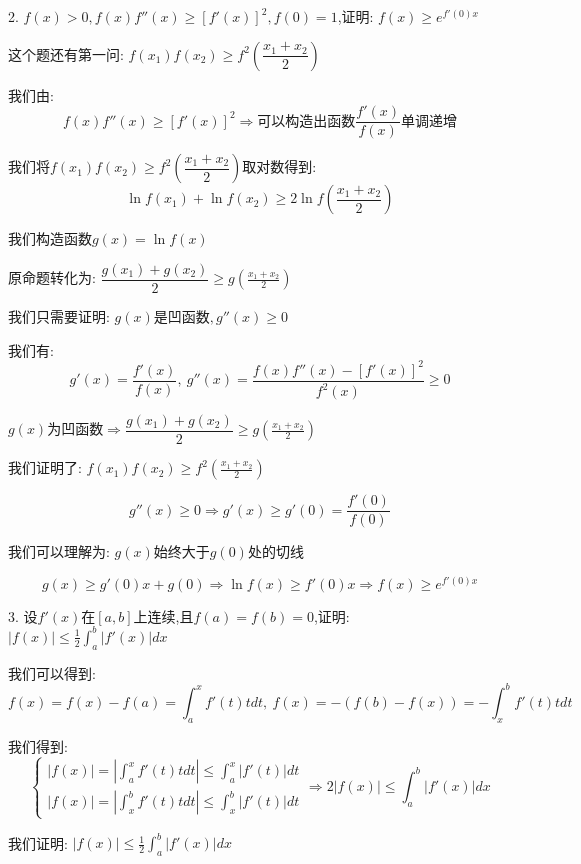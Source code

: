 
2. $f(x)>0,f(x)f''(x)\geq [f'(x)]^2,f(0)=1$,证明: $f(x)\geq e^{f'(0)x}$
\begin{solution}
	
	这个题还有第一问: $f(x_{1})f(x_{2})\geq f^2(\dfrac{x_{1}+x_{2}}{2})$
	
	我们由: $$f(x)f''(x)\geq [f'(x)]^2\Rightarrow \text{可以构造出函数}\frac{f'(x)}{f(x)}\text{单调递增}$$
	
	我们将$f(x_{1})f(x_{2})\geq f^2(\dfrac{x_{1}+x_{2}}{2})$取对数得到: 
	$$\ln f(x_{1})+\ln f(x_{2})\geq 2\ln f(\frac{x_{1}+x_{2}}{2})$$
	
	我们构造函数$g(x)=\ln f(x)$
	
	原命题转化为: $\dfrac{g(x_{1})+g(x_{2})}{2}\geq g(\frac{x_{1}+x_{2}}{2})$
	
	我们只需要证明: $g(x)\text{是凹函数},g''(x)\geq 0$
	
	我们有: $$g'(x)=\dfrac{f'(x)}{f(x)},\ g''(x)=\dfrac{f(x)f''(x)-[f'(x)]^2}{f^2(x)}\geq 0$$
	
	$g(x)\text{为凹函数}\Rightarrow \dfrac{g(x_{1})+g(x_{2})}{2}\geq g(\frac{x_{1}+x_{2}}{2})$
	
	我们证明了: $f(x_{1})f(x_{2})\geq f^2(\frac{x_{1}+x_{2}}{2})$
	
	$$g''(x)\geq 0\Rightarrow g'(x)\geq g'(0)=\dfrac{f'(0)}{f(0)}$$
	
	我们可以理解为: $g(x)\text{始终大于}g(0)\text{处的切线}$
	
	$$g(x)\geq g'(0)x+g(0)\Rightarrow \ln f(x)\geq f'(0)x\Rightarrow f(x)\geq e^{f'(0)x}$$
\end{solution}


3. 设$f'(x)$在$[a,b]$上连续,且$f(a)=f(b)=0$,证明: $|f(x)|\leq \frac{1}{2}\int_{a}^{b}|f'(x)|dx$
\begin{solution}
	
	我们可以得到: $$f(x)=f(x)-f(a)=\int_{a}^{x}f'(t)tdt,\ f(x)=-(f(b)-f(x))=-\int_{x}^{b}f'(t)tdt$$
	
	我们得到: 
	$$\left\lbrace 
	\begin{array}{l}
		|f(x)|=|\int_{a}^{x}f'(t)tdt|\leq\int_{a}^{x}|f'(t)|dt\\
		|f(x)|=|\int_{x}^{b}f'(t)tdt|\leq\int_{x}^{b}|f'(t)|dt
	\end{array}
	\right. \Rightarrow 2|f(x)|\leq\int_{a}^{b}|f'(x)|dx$$
	
	我们证明: $|f(x)|\leq \frac{1}{2}\int_{a}^{b}|f'(x)|dx$
\end{solution}

